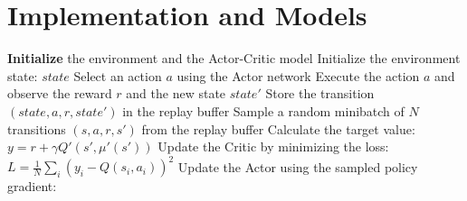 \section{Implementation and Models}


\begin{algorithmic}
\State \textbf{Initialize} the environment and the Actor-Critic model
    \State Initialize the environment state: $state$
        \State Select an action $a$ using the Actor network
        \State Execute the action $a$ and observe the reward $r$ and the new state $state'$
        \State Store the transition $(state, a, r, state')$ in the replay buffer
        \State Sample a random minibatch of $N$ transitions $(s, a, r, s')$ from the replay buffer
        \State Calculate the target value: $y = r + \gamma Q'(s', \mu'(s'))$
        \State Update the Critic by minimizing the loss: $L = \frac{1}{N} \sum_i (y_i - Q(s_i, a_i))^2$
        \State Update the Actor using the sampled policy gradient:
        \
    \EndFor
\EndFor
\end{algorithmic}
